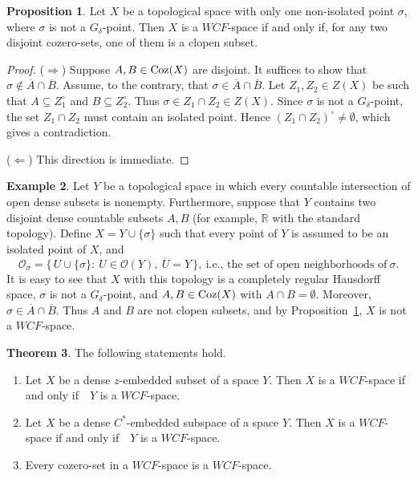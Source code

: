\documentclass{amsart}
\theoremstyle{definition}
\theoremstyle{remark}
\numberwithin{equation}{section}
\newcommand{\CO}{\mathcal{O}}
\newcommand{\coz}{{\rm Coz}}
\newcommand{\de}{\delta}
\newcommand{\si}{\sigma}
\newcommand{\cc}{\circ}
\newcommand{\ov}{\overline}
\def\ifif {if and only if\ \ }
\def\BBR{\mathbb{R}}
\theoremstyle{definition}\newtheorem{thm}{Theorem}[section]
\theoremstyle{definition}\newtheorem{cor}[thm]{Corollary}
\theoremstyle{definition}\newtheorem{lem}[thm]{Lemma}
\theoremstyle{definition}\newtheorem{prop}[thm]{Proposition}
\theoremstyle{definition}\newtheorem{defn}[thm]{Definition}
\theoremstyle{definition}\newtheorem{Rem}[thm]{Remark}
\theoremstyle{remark}\newtheorem{rem}[thm]{Remark}
\theoremstyle{definition}\newtheorem{exam}[thm]{Example}
\theoremstyle{definition}\newtheorem{qu}[thm]{question}
\begin{document}
\begin{prop}\label{jan}
Let $X$ be a topological space with only one non-isolated point $\si$, where $\si$ is not a $G_\de$-point.  
Then $X$ is a $WCF$-space if and only if, for any two disjoint cozero-sets, one of them is a clopen subset.
\end{prop}
\begin{proof}
($\Rightarrow$)  
Suppose $A,B\in\coz(X)$ are disjoint. It suffices to show that $\si\notin \ov{A}\cap \ov{B}$.  
Assume, to the contrary, that $\si\in \ov{A}\cap \ov{B}$.  
Let $Z_1,Z_2\in Z(X)$ be such that $A\subseteq Z_1^\cc$ and $B\subseteq Z_2^\cc$.  
Thus $\si\in Z_1\cap Z_2 \in Z(X)$.  Since $\si$ is not a $G_\de$-point, the set $Z_1\cap Z_2$ must contain an isolated point.  
Hence $(Z_1\cap Z_2)^\cc\neq\emptyset$, which gives a contradiction.  

($\Leftarrow$)  
This direction is immediate.
\end{proof}

\begin{exam}
Let $Y$ be a topological space in which every countable intersection of open dense subsets is nonempty. Furthermore, suppose that $Y$ contains two disjoint dense countable subsets $A,B$ (for example, $\BBR$ with the standard topology).  
Define $X=Y\cup\{\si\}$ such that every point of $Y$ is assumed to be an isolated point of $X$, and 
\[
\CO_\si=\{\,U\cup\{\si\}:~U\in\CO(Y),\ \ov{U}=Y\,\},~ 
\text{i.e., the set of open neighborhoods of}~\sigma.\]
It is easy to see that $X$ with this topology is a completely regular Hausdorff space, $\si$ is not a $G_\de$-point, and $A,B\in\coz(X)$ with $A\cap B=\emptyset$.  
Moreover, $\si\in\ov{A}\cap\ov{B}$.  
Thus $A$ and $B$ are not clopen subsets, and by Proposition~\ref{jan}, $X$ is not a $WCF$-space.
\end{exam}

\begin{thm}\label{sara}
The following statements hold.
\begin{enumerate}
\item Let $X$ be a dense $z$-embedded subset of a space $Y$. Then $X$ is a $WCF$-space \ifif $Y$ is a $WCF$-space.

\item Let $X$ be a dense $C^*$-embedded subspace of a space $Y$. Then $X$ is a $WCF$-space \ifif $Y$ is a $WCF$-space.

\item Every cozero-set in a $WCF$-space is a $WCF$-space.
\end{enumerate}
\end{thm}
\end{document}

